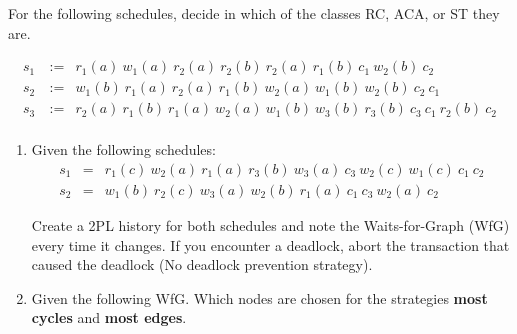 


\newcommand{\subtitle}{\textbf{Exercise 11}}
\newcommand{\outdate}{22.01.2024}
\newcommand{\duedate}{29.01.2024 12:00 MEZ}
\newcommand{\video}{061}






For the following schedules, decide in which of the classes RC, ACA, or ST they are.

\begin{eqnarray*}
s_1\ &:=&r_1(a)\ w_1(a)\ r_2(a)\ r_2(b)\ r_2(a)\ r_1(b)\ c_1\ w_2(b)\ c_2\\
s_2\ &:=&w_1(b)\ r_1(a)\ r_2(a)\ r_1(b)\ w_2(a)\ w_1(b)\ w_2(b)\ c_2\ c_1\\
s_3\ &:=&r_2(a)\ r_1(b)\ r_1(a)\ w_2(a)\ w_1(b)\ w_3(b)\ r_3(b)\ c_3\ c_1\ r_2(b)\ c_2\\
\end{eqnarray*}


\begin{enumerate}
\item
  Given the following schedules:
  \begin{eqnarray*}
  s_1 &=& r_1(c)\ w_2(a)\ r_1(a)\ r_3(b)\ w_3(a)\ c_3\ w_2(c)\ w_1(c)\ c_1\ c_2\\
  s_2 &=& w_1(b)\ r_2(c)\ w_3(a)\ w_2(b)\ r_1(a)\ c_1\ c_3\ w_2(a)\ c_2\ 
  \end{eqnarray*}

  Create a 2PL history for both schedules and note the Waits-for-Graph (WfG) every time it changes.
  If you encounter a deadlock, abort the transaction that caused the deadlock (No deadlock prevention strategy).

\item Given the following WfG.
Which nodes are chosen for the strategies \textbf{most cycles} and \textbf{most edges}.


\end{enumerate}

